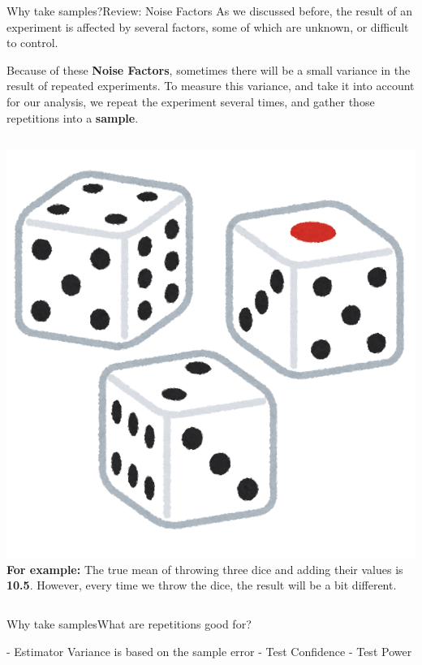 \begin{frame}{Why take samples?}{Review: Noise Factors}
  As we discussed before, the result of an experiment is affected by several factors, some of which are unknown, or difficult to control.\bigskip

  Because of these {\bf Noise Factors}, sometimes there will be a small variance in the result of repeated experiments. To measure this variance, and take it into account for our analysis, we repeat the experiment several times, and gather those repetitions into a {\bf sample}.\bigskip


  \begin{columns}
      \includegraphics[width=\textwidth]{../img/irasutoya_dice}
      {\bf For example:} The true mean of throwing three dice and adding their values is {\bf 10.5}. However, every time we throw the dice, the result will be a bit different.
  \end{columns}
\end{frame}

\begin{frame}{Why take samples}{What are repetitions good for?}

  - Estimator Variance is based on the sample error
  - Test Confidence
  - Test Power

\end{frame}


